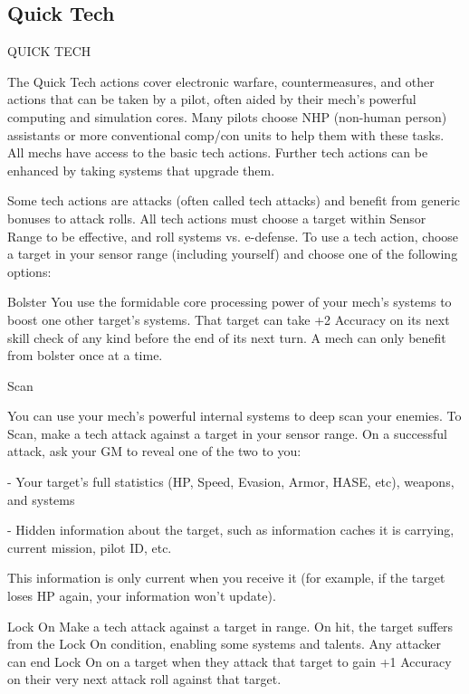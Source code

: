\subsection{Quick Tech}

                                              QUICK TECH

The Quick Tech actions cover electronic warfare, countermeasures, and other actions that can
be taken by a pilot, often aided by their mech’s powerful computing and simulation cores. Many
pilots choose NHP (non-human person) assistants or more conventional comp/con units to help
them with these tasks. All mechs have access to the basic tech actions. Further tech actions can
be enhanced by taking systems that upgrade them.


Some tech actions are attacks (often called tech attacks) and benefit from generic bonuses to
attack rolls. All tech actions must choose a target within Sensor Range to be effective, and roll
systems vs. e-defense. To use a tech action, choose a target in your sensor range (including
yourself) and choose one of the following options:


Bolster
You use the formidable core processing power of your mech’s systems to boost one other
target’s systems. That target can take +2 Accuracy on its next skill check of any kind before the
end of its next turn. A mech can only benefit from bolster once at a time.


Scan

You can use your mech’s powerful internal systems to deep scan your enemies.
To Scan, make a tech attack against a target in your sensor range. On a successful attack, ask
your GM to reveal one of the two to you:

             -   Your target’s full statistics (HP, Speed, Evasion, Armor, HASE, etc), weapons, and
                 systems

             -   Hidden information about the target, such as information caches it is carrying,
                 current mission, pilot ID, etc.

This information is only current when you receive it (for example, if the target loses HP again,
your information won’t update).


Lock On
Make a tech attack against a target in range. On hit, the target suffers from the Lock On
condition, enabling some systems and talents. Any attacker can end Lock On on a target when
they attack that target to gain +1 Accuracy on their very next attack roll against that target.


